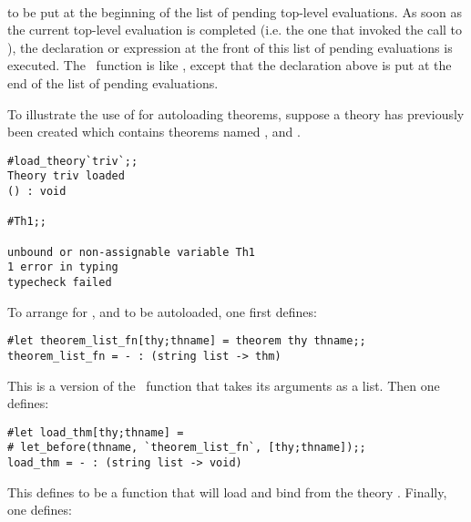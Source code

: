 \bigskip

{\small

\noindent\ \ \ 
}

\bigskip

\noindent to be put at the beginning of the list of pending top-level
evaluations.  As soon as the current top-level evaluation is completed (i.e.
the one that invoked the call to ), the declaration or
expression at the front of this list of pending evaluations is executed. The
\ML\ function  is like , except that the
declaration above is put at the end of the list of pending evaluations.

To illustrate the use of  for autoloading theorems, suppose a
theory  has previously been created which contains theorems named
,  and .

\begin{session}\begin{verbatim}
#load_theory`triv`;;
Theory triv loaded
() : void

#Th1;;

unbound or non-assignable variable Th1
1 error in typing
typecheck failed      
\end{verbatim}\end{session}

\noindent To arrange for ,  and  to be autoloaded,
one first defines:

\begin{session}\begin{verbatim}
#let theorem_list_fn[thy;thname] = theorem thy thname;;
theorem_list_fn = - : (string list -> thm)
\end{verbatim}\end{session}

\noindent This is a version of the \ML\ function  that takes its arguments as a
list. Then one defines:

\begin{session}\begin{verbatim}
#let load_thm[thy;thname] = 
# let_before(thname, `theorem_list_fn`, [thy;thname]);;
load_thm = - : (string list -> void)
\end{verbatim}\end{session}

\noindent This defines  to be a function that will load and
bind  from the theory . Finally, one defines:

